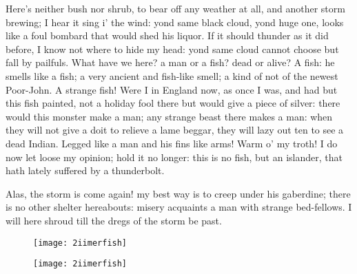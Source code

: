 \begin{prose_speech}[Trinculo] 
Here's neither bush nor shrub, to bear off any weather at all, and another storm brewing; I hear it sing i' the wind: yond same black cloud, yond huge one, looks like a foul bombard that would shed his liquor. If it should thunder as it did before, I know not where to hide my head: yond same cloud cannot choose but fall by pailfuls. What have we here? a man or a fish? dead or alive? A fish: he smells like a fish; a very ancient and fish-like smell; a kind of not of the newest Poor-John. A strange fish! Were I in England now, as once I was, and had but this fish painted, not a holiday fool there but would give a piece of silver: there would this monster make a man; any strange beast there makes a man: when they will not give a doit to relieve a lame beggar, they will lazy out ten to see a dead Indian. Legged like a man and his fins like arms! Warm o' my troth! I do now let loose my opinion; hold it no longer: this is no fish, but an islander, that hath lately suffered by a thunderbolt.


Alas, the storm is come again! my best way is to creep under his gaberdine; there is no other shelter hereabouts: misery acquaints a man with strange bed-fellows. I will here shroud till the dregs of the storm be past.
\end{prose_speech}

\begin{letter}
	\begin{figure}[tb]
		\centering
		\texttt{[image: 2iimerfish]}
	\end{figure}
\end{letter}
\begin{a4}
	\begin{figure}[tb]
		\centering
		\texttt{[image: 2iimerfish]}
	\end{figure}
\end{a4}


